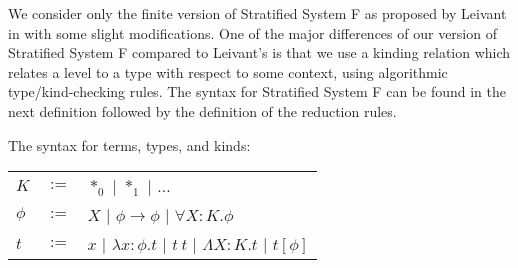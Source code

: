 We consider only the finite version of Stratified System F as proposed by Leivant in 
\cite{Leivant:1991} with some slight modifications.  One of the major differences of 
our version of Stratified System F compared to Leivant's is that we use a  
kinding relation which relates a level to a type with respect to some context, using 
algorithmic type/kind-checking rules. The syntax for Stratified System F can be found 
in the next definition followed by the definition of the reduction rules.
\begin{definition}
  \label{def:syntax_ssf}
  The syntax for terms, types, and kinds:
  \begin{center}
    \begin{tabular}{lll}
      $K$ & $:=$ & $*_0$ $|$ $*_1$             $|$ $\ldots$\\
      $\phi$ & $:=$ & $X$   $|$ $\phi \rightarrow \phi$ $|$ $\forall X:K.\phi$\\
      $t$ & $:=$ & $x$   $|$ $\lambda x:\phi.t$   $|$ $t\ t$ $|$ $\Lambda X:K.t$ $|$ $t[\phi]$\\
    \end{tabular}
  \end{center}
\end{definition}

